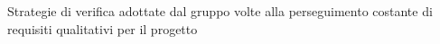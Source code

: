 Strategie di verifica adottate dal gruppo \gruppo volte alla perseguimento costante di requisiti qualitativi per il progetto \progetto
